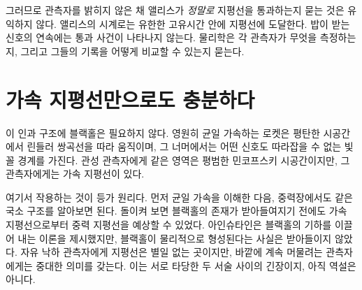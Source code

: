 \begin{classroomqa}\end{classroomqa}

그러므로 관측자를 밝히지 않은 채 앨리스가 \emph{정말로} 지평선을 통과하는지 묻는 것은 유익하지 않다. 앨리스의 시계로는 유한한 고유시간 안에 지평선에 도달한다. 밥이 받는 신호의 연속에는 통과 사건이 나타나지 않는다. 물리학은 각 관측자가 무엇을 측정하는지, 그리고 그들의 기록을 어떻게 비교할 수 있는지 묻는다.

\begin{classroomqa}\end{classroomqa}

\section{가속 지평선만으로도 충분하다}

이 인과 구조에 블랙홀은 필요하지 않다. 영원히 균일 가속하는 로켓은 평탄한 시공간에서 린들러 쌍곡선을 따라 움직이며, 그 너머에서는 어떤 신호도 따라잡을 수 없는 빛꼴 경계를 가진다. 관성 관측자에게 같은 영역은 평범한 민코프스키 시공간이지만, 그 관측자에게는 가속 지평선이 있다.

\begin{classroomqa}\end{classroomqa}

여기서 작용하는 것이 등가 원리다. 먼저 균일 가속을 이해한 다음, 중력장에서도 같은 국소 구조를 알아보면 된다. 돌이켜 보면 블랙홀의 존재가 받아들여지기 전에도 가속 지평선으로부터 중력 지평선을 예상할 수 있었다. 아인슈타인은 블랙홀의 기하를 이끌어 내는 이론을 제시했지만, 블랙홀이 물리적으로 형성된다는 사실은 받아들이지 않았다. 자유 낙하 관측자에게 지평선은 별일 없는 곳이지만, 바깥에 계속 머물려는 관측자에게는 중대한 의미를 갖는다. 이는 서로 타당한 두 서술 사이의 긴장이지, 아직 역설은 아니다.

